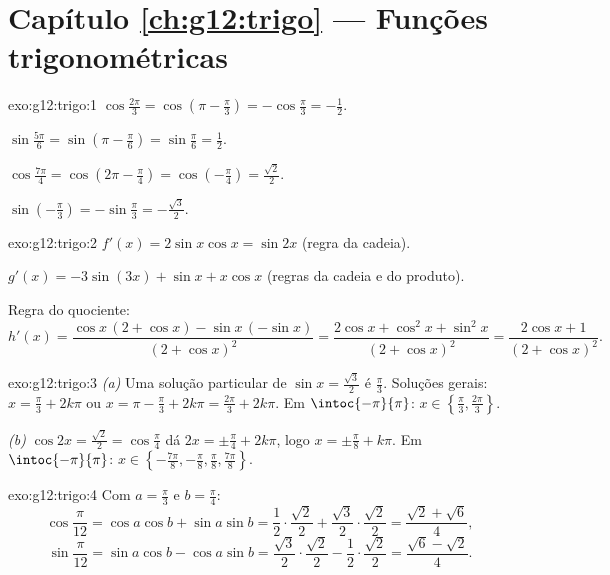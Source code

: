 \section*{Capítulo \ref{ch:g12:trigo} --- Funções trigonométricas}

\begin{solution}{exo:g12:trigo:1}
$\cos\frac{2\pi}{3} = \cos\left(\pi - \frac\pi3\right) = -\cos\frac\pi3
= -\frac12$.

$\sin\frac{5\pi}{6} = \sin\left(\pi - \frac\pi6\right) = \sin\frac\pi6
= \frac12$.

$\cos\frac{7\pi}{4} = \cos\left(2\pi - \frac{\pi}{4}\right)
= \cos\left(-\frac\pi4\right) = \frac{\sqrt2}{2}$.

$\sin\left(-\frac\pi3\right) = -\sin\frac\pi3 = -\frac{\sqrt3}{2}$.
\end{solution}

\begin{solution}{exo:g12:trigo:2}
$f'(x) = 2\sin x\cos x = \sin 2x$ (regra da cadeia).

$g'(x) = -3\sin(3x) + \sin x + x\cos x$ (regras da cadeia e do produto).

Regra do quociente:
\[
h'(x) = \frac{\cos x\,(2 + \cos x) - \sin x\,(-\sin x)}{(2+\cos x)^2}
= \frac{2\cos x + \cos^2 x + \sin^2 x}{(2+\cos x)^2}
= \frac{2\cos x + 1}{(2+\cos x)^2}.
\]
\end{solution}

\begin{solution}{exo:g12:trigo:3}
\emph{(a)} Uma solução particular de $\sin x = \frac{\sqrt3}{2}$ é
$\frac\pi3$. Soluções gerais: $x = \frac\pi3 + 2k\pi$ ou
$x = \pi - \frac\pi3 + 2k\pi = \frac{2\pi}{3} + 2k\pi$. Em
$\intoc{-\pi}{\pi}$: $x \in \left\{\frac\pi3, \frac{2\pi}{3}\right\}$.

\emph{(b)} $\cos 2x = \frac{\sqrt2}{2} = \cos\frac\pi4$ dá
$2x = \pm\frac\pi4 + 2k\pi$, logo $x = \pm\frac\pi8 + k\pi$. Em
$\intoc{-\pi}{\pi}$:
$x \in \left\{-\frac{7\pi}{8}, -\frac\pi8, \frac\pi8,
\frac{7\pi}{8}\right\}$.
\end{solution}

\begin{solution}{exo:g12:trigo:4}
Com $a = \frac\pi3$ e $b = \frac\pi4$:
\[
\cos\frac{\pi}{12} = \cos a\cos b + \sin a \sin b
= \frac12\cdot\frac{\sqrt2}{2} + \frac{\sqrt3}{2}\cdot\frac{\sqrt2}{2}
= \frac{\sqrt2 + \sqrt6}{4},
\]
\[
\sin\frac{\pi}{12} = \sin a\cos b - \cos a \sin b
= \frac{\sqrt3}{2}\cdot\frac{\sqrt2}{2} - \frac12\cdot\frac{\sqrt2}{2}
= \frac{\sqrt6 - \sqrt2}{4}.
\]
\end{solution}

